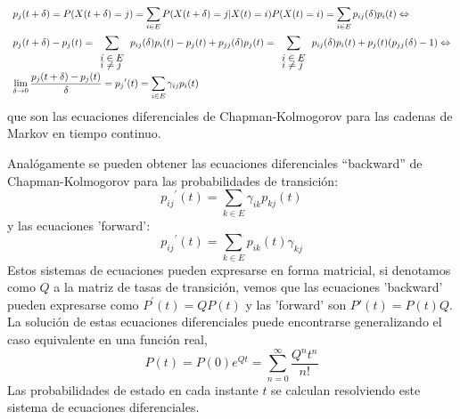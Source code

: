 \[
\begin{array}{l}
p_j(t+\delta)=P(X(t+\delta)=j)=\displaystyle\sum_{i\in
E}P(X(t+\delta) = j |
X(t)=i)P(X(t)=i)=%
\displaystyle\sum_{i\in E}p_{ij}(\delta)p_i(t)\Leftrightarrow\\[15pt]
p_j(t+\delta)-p_j(t)=\displaystyle\sum_{\begin{array}{l}i\in E\\[-5pt]i\neq j\end{array}}
p_{ij}(\delta)p_i(t)-
p_j(t)+p_{jj}(\delta)p_j(t)=%
\displaystyle\sum_{\begin{array}{l}i\in E\\[-5pt]i\neq j\end{array}}
p_{ij}(\delta)p_i(t)+p_j(t)(p_{jj}(\delta)-1)\Leftrightarrow\\[10pt]
\displaystyle\displaystyle\lim_{\delta \to
0}\dfrac{p_j(t+\delta)-p_j(t)}{\delta}={p_j}^{\prime}(t)=\displaystyle\sum_{i\in
E} \gamma_{ij}p_i(t)
\end{array}
\]
que son las ecuaciones diferenciales de Chapman-Kolmogorov para
las cadenas de Markov en tiempo continuo.
\par
Anal\'{o}gamente se pueden obtener las ecuaciones diferenciales
``backward'' de Chapman-Kolmo\-go\-rov para las probabilidades de
transici\'{o}n:
\[
{p_{ij}}^{\prime}(t)=\displaystyle\sum_{k\in
E}\gamma_{ik}p_{kj}(t)
\]
y las ecuaciones 'forward':
\[
{p_{ij}}^{\prime}(t)=\displaystyle\sum_{k\in
E}p_{ik}(t)\gamma_{kj}
\]
Estos sistemas de ecuaciones pueden expresarse en forma matricial,
si denotamos como $Q$ a la matriz de tasas de transici\'{o}n, vemos
que las ecuaciones 'backward' pueden expresarse como
$P^\prime(t)=QP(t)$ y las 'forward' son $P'(t)=P(t)Q$. La
soluci\'{o}n de estas ecuaciones diferenciales puede encontrarse
generalizando el caso equivalente en una funci\'{o}n real,
\[
P(t)=P(0)e^{Qt}=\displaystyle\sum_{n=0}^\infty \dfrac{Q^nt^n}{n!}
\]
Las probabilidades de estado en cada instante $t$ se calculan
resolviendo este sistema de ecuaciones diferenciales.
